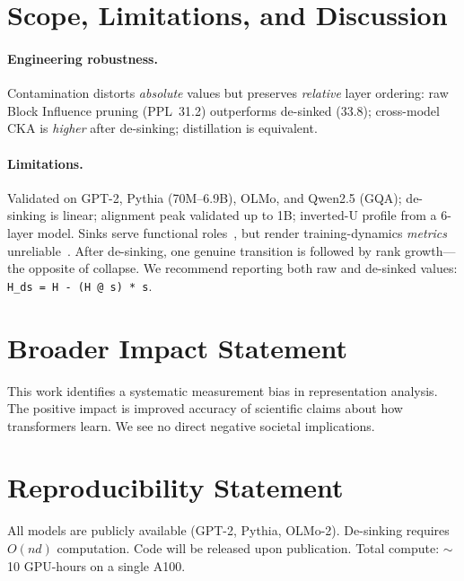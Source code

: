 \documentclass[11pt]{article}
\begin{document}
\section{Scope, Limitations, and Discussion}\label{sec:discussion}

\paragraph{Engineering robustness.}
Contamination distorts \emph{absolute} values but preserves \emph{relative} layer ordering: raw Block Influence pruning (PPL~31.2) outperforms de-sinked (33.8); cross-model CKA is \emph{higher} after de-sinking; distillation is equivalent.

\paragraph{Limitations.}
Validated on GPT-2, Pythia (70M--6.9B), OLMo, and Qwen2.5 (GQA); de-sinking is linear; alignment peak validated up to 1B; inverted-U profile from a 6-layer model.
Sinks serve functional roles~\citep{barbero2025why,queipodellano2025sinks,zhang2025catch}, but render training-dynamics \emph{metrics} unreliable~\citep[cf.][]{li2025tracing,kulkarni2026disentangling}. After de-sinking, one genuine transition is followed by rank growth---the opposite of collapse. We recommend reporting both raw and de-sinked values: \texttt{H\_ds = H - (H @ s) * s}.

\section*{Broader Impact Statement}
This work identifies a systematic measurement bias in representation analysis.
The positive impact is improved accuracy of scientific claims about how transformers learn.
We see no direct negative societal implications.

\section*{Reproducibility Statement}
All models are publicly available (GPT-2, Pythia, OLMo-2).
De-sinking requires $O(nd)$ computation.
Code will be released upon publication.
Total compute: ${\sim}$10 GPU-hours on a single A100.
\end{document}

